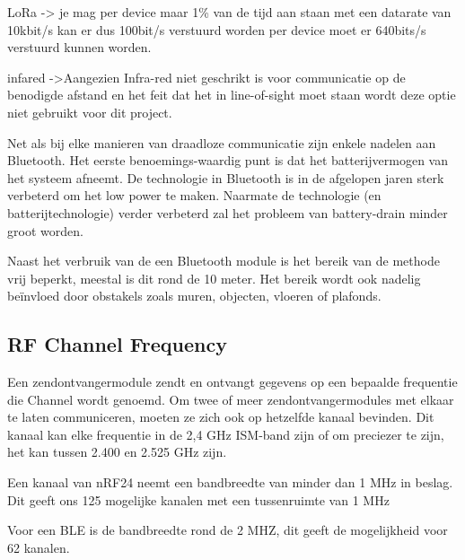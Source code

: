 LoRa -> je mag per device maar 1\% van de tijd aan staan met een datarate van 10kbit/s kan er dus 100bit/s verstuurd worden per device moet er 640bits/s verstuurd kunnen worden.

infared ->Aangezien Infra-red niet geschrikt is voor communicatie op de benodigde afstand en het feit dat het in line-of-sight moet staan wordt deze optie niet gebruikt voor dit project. 


Net als bij elke manieren van draadloze communicatie zijn enkele nadelen aan Bluetooth. Het eerste benoemings-waardig punt is dat het batterijvermogen van het systeem afneemt. De technologie in Bluetooth is in de afgelopen jaren sterk verbeterd om het low power te maken. Naarmate de technologie (en batterijtechnologie) verder verbeterd zal het probleem van battery-drain minder groot worden.

Naast het verbruik van de een Bluetooth module is het bereik van de methode vrij beperkt, meestal is dit rond de 10 meter. Het bereik wordt ook nadelig beïnvloed door obstakels zoals muren, objecten, vloeren of plafonds.

\subsection{RF Channel Frequency}

Een zendontvangermodule zendt en ontvangt gegevens op een bepaalde frequentie die Channel wordt genoemd. Om twee of meer zendontvangermodules met elkaar te laten communiceren, moeten ze zich ook op hetzelfde kanaal bevinden. Dit kanaal kan elke frequentie in de 2,4 GHz ISM-band zijn of om preciezer te zijn, het kan tussen 2.400 en 2.525 GHz zijn.

Een kanaal van nRF24 neemt een bandbreedte van minder dan 1 MHz in beslag. Dit geeft ons 125 mogelijke kanalen met een tussenruimte van 1 MHz

Voor een BLE is de bandbreedte rond de 2 MHZ, dit geeft de mogelijkheid voor 62 kanalen.



